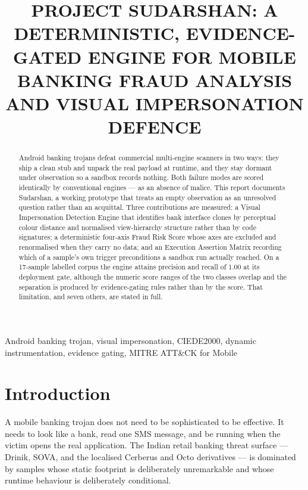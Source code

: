 \documentclass{article}
\title{PROJECT SUDARSHAN: A DETERMINISTIC, EVIDENCE-GATED ENGINE FOR MOBILE
BANKING FRAUD ANALYSIS AND VISUAL IMPERSONATION DEFENCE}
\begin{document}
\ninept
\maketitle

\begin{abstract}
Android banking trojans defeat commercial multi-engine scanners in two ways:
they ship a clean stub and unpack the real payload at runtime, and they stay
dormant under observation so a sandbox records nothing. Both failure modes are
scored identically by conventional engines --- as an absence of malice. This
report documents Sudarshan, a working prototype that treats an empty
observation as an unresolved question rather than an acquittal. Three
contributions are measured: a Visual Impersonation Detection Engine that
identifies bank interface clones by perceptual colour distance and normalised
view-hierarchy structure rather than by code signatures; a deterministic
four-axis Fraud Risk Score whose axes are excluded and renormalised when they
carry no data; and an Execution Assertion Matrix recording which of a sample's
own trigger preconditions a sandbox run actually reached. On a 17-sample
labelled corpus the engine attains precision and recall of 1.00 at its
deployment gate, although the numeric score ranges of the two classes overlap
and the separation is produced by evidence-gating rules rather than by the
score. That limitation, and seven others, are stated in full.
\end{abstract}

\begin{keywords}
Android banking trojan, visual impersonation, CIEDE2000, dynamic
instrumentation, evidence gating, MITRE ATT\&CK for Mobile
\end{keywords}

\section{Introduction}
\label{sec:intro}

A mobile banking trojan does not need to be sophisticated to be effective. It
needs to look like a bank, read one SMS message, and be running when the victim
opens the real application. The Indian retail banking threat surface --- Drinik,
SOVA, and the localised Cerberus and Octo derivatives --- is dominated by
samples whose static footprint is deliberately unremarkable and whose runtime
behaviour is deliberately conditional.
\end{document}
